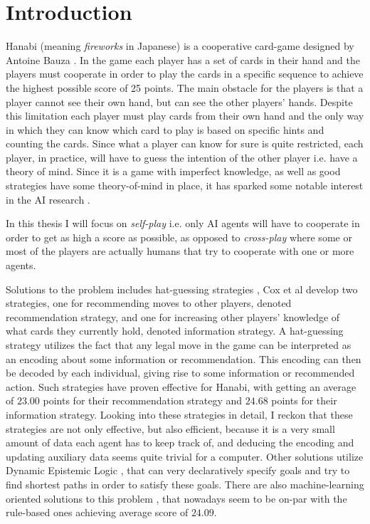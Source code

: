 \section{Introduction}

Hanabi (meaning \emph{fireworks} in Japanese) is a cooperative card-game designed by Antoine Bauza \cite{BGGHanabi}. 
In the game each player has a set of cards in their hand and the players must cooperate in order to play the cards in a specific sequence to achieve the highest possible score of 25 points.
The main obstacle for the players is that a player cannot see their own hand, but can see the other players' hands. 
Despite this limitation each player must play cards from their own hand and the only way in which they can know which card to play is based on specific hints and counting the cards. 
Since what a player can know for sure is quite restricted, each player, in practice, will have to guess the intention of the other player i.e. have a theory of mind. 
Since it is a game with imperfect knowledge, as well as good strategies have some theory-of-mind in place, it has sparked some notable interest in the AI research \cite{DeepmindAndOthers}. 

In this thesis I will focus on \emph{self-play} i.e. only AI agents will have to cooperate in order to get as high a score as possible, as opposed to \emph{cross-play} where some or most of the players are actually humans that try to cooperate with one or more agents.  

Solutions to the problem includes hat-guessing strategies \cite{CoxEtAl2015}, Cox et al develop two strategies, one for recommending moves to other players, denoted recommendation strategy, and one for increasing other players' knowledge of what cards they currently hold, denoted information strategy. 
A hat-guessing strategy utilizes the fact that any legal move in the game can be interpreted as an encoding about some information or recommendation.
This encoding can then be decoded by each individual, giving rise to some information or recommended action. 
Such strategies have proven effective for Hanabi, with \cite{CoxEtAl2015} getting an average of $23.00$ points for their recommendation strategy and $24.68$ points for their information strategy. 
Looking into these strategies in detail, I reckon that these strategies are not only effective, but also efficient, because it is a very small amount of data each agent has to keep track of, and deducing the encoding and updating auxiliary data seems quite trivial for a computer.
Other solutions utilize Dynamic Epistemic Logic \cite{EgerAndMartens17}, that can very declaratively specify goals and try to find shortest paths in order to satisfy these goals. 
There are also machine-learning oriented solutions to this problem \cite{hu2021otherplay}, that nowadays seem to be on-par with the rule-based ones achieving average score of $24.09$.

